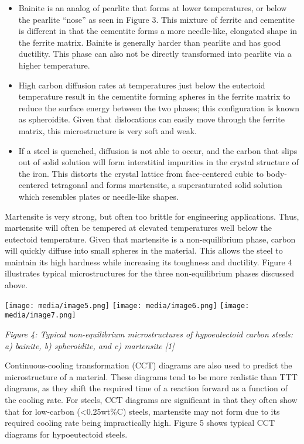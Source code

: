 \documentclass[]{article}
\begin{document}
\begin{itemize}
\item
  Bainite is an analog of pearlite that forms at lower temperatures, or
  below the pearlite ``nose'' as seen in Figure 3. This mixture of
  ferrite and cementite is different in that the cementite forms a more
  needle-like, elongated shape in the ferrite matrix. Bainite is
  generally harder than pearlite and has good ductility. This phase can
  also not be directly transformed into pearlite via a higher
  temperature.
\item
  High carbon diffusion rates at temperatures just below the eutectoid
  temperature result in the cementite forming spheres in the ferrite
  matrix to reduce the surface energy between the two phases; this
  configuration is known as spheroidite. Given that dislocations can
  easily move through the ferrite matrix, this microstructure is very
  soft and weak.
\item
  If a steel is quenched, diffusion is not able to occur, and the carbon
  that slips out of solid solution will form interstitial impurities in
  the crystal structure of the iron. This distorts the crystal lattice
  from face-centered cubic to body-centered tetragonal and forms
  martensite, a supersaturated solid solution which resembles plates or
  needle-like shapes.
\end{itemize}

Martensite is very strong, but often too brittle for engineering
applications. Thus, martensite will often be tempered at elevated
temperatures well below the eutectoid temperature. Given that martensite
is a non-equilibrium phase, carbon will quickly diffuse into small
spheres in the material. This allows the steel to maintain its high
hardness while increasing its toughness and ductility. Figure 4
illustrates typical microstructures for the three non-equilibrium phases
discussed above.

\texttt{[image: media/image5.png]}
\texttt{[image: media/image6.png]}
\texttt{[image: media/image7.png]}

\emph{Figure 4: Typical non-equilibrium microstructures of hypoeutectoid
carbon steels: a) bainite, b) spheroidite, and c) martensite {[}1{]}}

Continuous-cooling transformation (CCT) diagrams are also used to
predict the microstructure of a material. These diagrams tend to be more
realistic than TTT diagrams, as they shift the required time of a
reaction forward as a function of the cooling rate. For steels, CCT
diagrams are significant in that they often show that for low-carbon
(\textless{}0.25wt\%C) steels, martensite may not form due to its
required cooling rate being impractically high. Figure 5 shows typical
CCT diagrams for hypoeutectoid steels.
\end{document}
